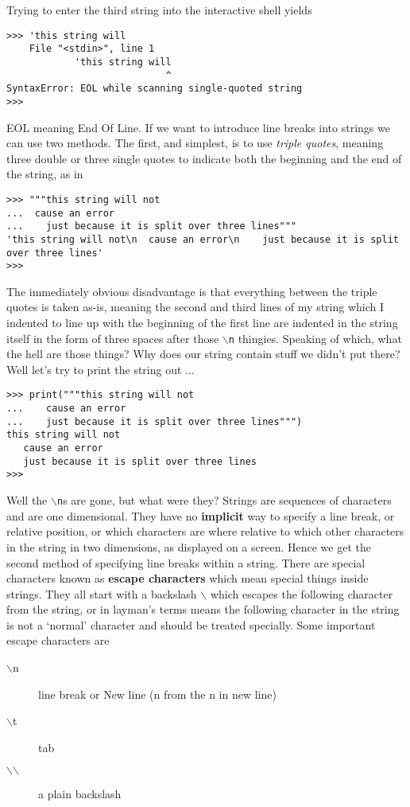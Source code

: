 Trying to enter the third string into the interactive shell yields
\begin{lstlisting}
>>> 'this string will
    File "<stdin>", line 1
            'this string will
                            ^
SyntaxError: EOL while scanning single-quoted string
>>>
\end{lstlisting}

EOL meaning End Of Line. If we want to introduce line breaks into   strings we can use two methods. The first, and simplest, is to use   \textit{triple quotes}, meaning three double or three single quotes to indicate   both the beginning and the end of the string, as in
\begin{lstlisting}
>>> """this string will not
...  cause an error
...    just because it is split over three lines"""
'this string will not\n  cause an error\n    just because it is split over three lines'
>>>
\end{lstlisting}

The immediately obvious disadvantage is that everything between the   triple quotes is taken as-is, meaning the second and third lines of my   string which I indented to line up with the beginning of the first line   are indented in the string itself in the form of three spaces after   those \texttt{$\backslash$n} thingies. Speaking of which, what the hell are those things?   Why does our string contain stuff we didn't put there? Well let's try   to print the string out ...
\begin{lstlisting}
>>> print("""this string will not
...    cause an error
...    just because it is split over three lines""")
this string will not
   cause an error
   just because it is split over three lines
>>>
\end{lstlisting}

Well the \texttt{$\backslash$n}s are gone, but what were they? Strings are sequences   of characters and are one dimensional. They have no   \textbf{implicit} way to specify a line break, or relative   position, or which characters are where relative to which other   characters in the string in two dimensions, as displayed on a screen.   Hence we get the second method of specifying line breaks within a   string. There are special characters known as \textbf{escape     characters} which mean special things inside strings. They all   start with a backslash \texttt{$\backslash$} which escapes the following character from   the string, or in layman's terms means the following character in the   string is not a `normal' character and should be treated specially.   Some important escape characters are
\begin{description}
	\item[$\backslash$n] line break or New line (n from the n in new line)
	\item[$\backslash$t] tab
	\item[$\backslash$$\backslash$] a plain backslash
\end{description}

